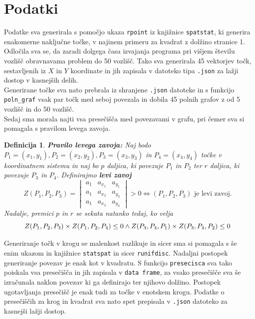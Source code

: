 \documentclass[12pt, a4paper]{article}
\newtheorem{definicija}{Definicija}
\begin{document}
	\section{Podatki}
	Podatke sva generirala s pomočjo ukaza \texttt{rpoint} iz knjižnice \texttt{spatstat}, ki generira enakomerne naključne točke, v najinem primeru za kvadrat z dolžino stranice 1. Odločila sva se, da zaradi dolgega časa izvajanja programa pri višjem številu vozlišč obravnavama problem do 50 vozlišč. Tako sva generirala 45 vektorjev točk, sestavljenih iz $X$ in $Y$ koordinate in jih zapisala v datoteko tipa \texttt{.json} za lažji dostop v kasnejših delih. \\
	Generirane točke sva nato prebrala iz shranjene \texttt{.json} datoteke in s funkcijo \texttt{poln\_graf} vsak par točk med seboj povezala in dobila 45 polnih grafov z od 5 vozlišč in do 50 vozlišč. \\
	Sedaj sma morala najti vsa presečišča med povezavami v grafu, pri čemer sva si pomagala s pravilom levega zavoja.
	\begin{definicija}
		\textbf{Pravilo levega zavoja:} Naj bodo $P_1=(x_1,y_1),P_2=(x_2,y_2),P_3=(x_3,y_3)$ in $P_4=(x_4,y_4)$ točke v koordinatnem sistemu in naj bo $p$ daljica, ki povezuje $P_1$ in $P_2$ ter $r$ daljica, ki povezuje $P_3$ in $P_4$. Definirajmo \textbf{levi zavoj}
		$$Z(P_1,P_2,P_3)=\begin{vmatrix}
			a_{1} & a_{x_1} & a_{y_1}\\ 
			a_{1} & a_{x_2} & a_{y_2}\\
			a_{1} & a_{x_3} & a_{y_3} 
		\end{vmatrix} > 0
	\Leftrightarrow (P_1,P_2,P_3) \text{ je levi zavoj.}$$
	Nadalje, premici $p$ in $r$ se sekata natanko tedaj, ko velja
	$$Z(P_1,P_2,P_3) \times Z(P_1,P_2,P_4) \leq 0 \wedge \\ 
	Z(P_3,P_4,P_1)\times Z(P_3,P_4,P_2)\leq 0$$
	\end{definicija}
	\noindent Generiranje točk v krogu se malenkost razlikuje in sicer sma si pomagala s še enim ukazom in knjižnice \texttt{statspat} in sicer \texttt{runifdisc}. Nadaljni postopek generiranje povezav je enak kot v kvadratu. 
	\noindent S funkcijo \texttt{presecisca} sva tako poiskala vsa presečišča in jih zapisala v \texttt{data frame}, za vsako presečišče sva še izračunala naklon povezav ki ga definirajo ter njihovo dolžino. Postopek ugotavljanja presečišč je enak tudi za točke v enotskem krogu. Podatke o presečiščih za krog in kvadrat sva nato spet prepisala v \texttt{.json} datoteko za kasnejši lažji dostop. \\
\end{document}
